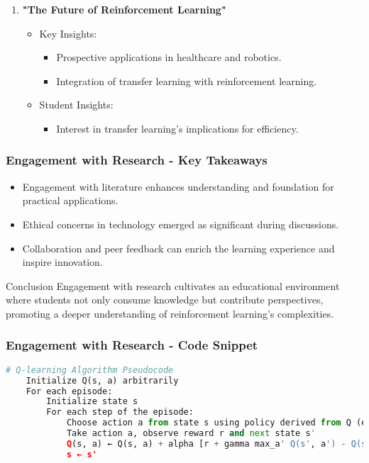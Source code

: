 \documentclass[aspectratio=169]{beamer}
\begin{document}
\begin{frame}[fragile]
\begin{enumerate}
        \item \textbf{"The Future of Reinforcement Learning"}
            \begin{itemize}
                \item Key Insights:
                    \begin{itemize}
                        \item Prospective applications in healthcare and robotics.
                        \item Integration of transfer learning with reinforcement learning.
                    \end{itemize}
                \item Student Insights:
                    \begin{itemize}
                        \item Interest in transfer learning's implications for efficiency.
                    \end{itemize}
            \end{itemize}
    \end{enumerate}
\end{frame}

\begin{frame}[fragile]
    \frametitle{Engagement with Research - Key Takeaways}
    \begin{itemize}
        \item Engagement with literature enhances understanding and foundation for practical applications.
        \item Ethical concerns in technology emerged as significant during discussions.
        \item Collaboration and peer feedback can enrich the learning experience and inspire innovation.
    \end{itemize}
    \begin{block}{Conclusion}
        Engagement with research cultivates an educational environment where students not only consume knowledge but contribute perspectives, promoting a deeper understanding of reinforcement learning's complexities.
    \end{block}
\end{frame}

\begin{frame}[fragile]
    \frametitle{Engagement with Research - Code Snippet}
    \begin{lstlisting}[language=Python]
    # Q-learning Algorithm Pseudocode
    Initialize Q(s, a) arbitrarily
    For each episode:
        Initialize state s
        For each step of the episode:
            Choose action a from state s using policy derived from Q (e.g., epsilon-greedy)
            Take action a, observe reward r and next state s'
            Q(s, a) ← Q(s, a) + alpha [r + gamma max_a' Q(s', a') - Q(s, a)]
            s ← s'
    \end{lstlisting}
\end{frame}
\end{document}
